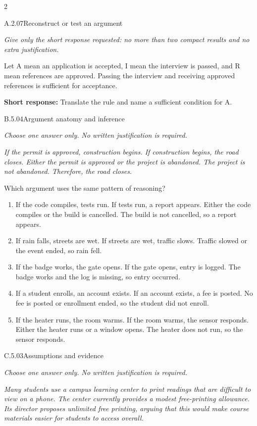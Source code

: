 \documentclass[9pt]{extarticle}
\newcommand{\choice}[1]{\item #1}
\begin{document}
\CoreWorkArea
\FormBreak
{}
\begin{multicols}{2}
\begin{DenseCoreProblem}{A.2.07}{Reconstruct or test an argument}
{\scriptsize\textit{Give only the short response requested: no more than two compact results and no extra justification.}\par}
Let A mean an application is accepted, I mean the interview is passed, and R mean references are approved. Passing the interview and receiving approved references is sufficient for acceptance.

\textbf{Short response:} Translate the rule and name a sufficient condition for A.
\end{DenseCoreProblem}
\begin{DenseCoreProblem}{B.5.04}{Argument anatomy and inference}
{\scriptsize\textit{Choose one answer only. No written justification is required.}\par}
\emph{If the permit is approved, construction begins. If construction begins, the road closes. Either the permit is approved or the project is abandoned. The project is not abandoned. Therefore, the road closes.}

Which argument uses the same pattern of reasoning?
\begin{enumerate}[label=(\alph*)]
  \choice{If the code compiles, tests run. If tests run, a report appears. Either the code compiles or the build is cancelled. The build is not cancelled, so a report appears.}
  \choice{If rain falls, streets are wet. If streets are wet, traffic slows. Traffic slowed or the event ended, so rain fell.}
  \choice{If the badge works, the gate opens. If the gate opens, entry is logged. The badge works and the log is missing, so entry occurred.}
  \choice{If a student enrolls, an account exists. If an account exists, a fee is posted. No fee is posted or enrollment ended, so the student did not enroll.}
  \choice{If the heater runs, the room warms. If the room warms, the sensor responds. Either the heater runs or a window opens. The heater does not run, so the sensor responds.}
\end{enumerate}
\end{DenseCoreProblem}
\columnbreak
\begin{DenseCoreProblem}{C.5.03}{Assumptions and evidence}
{\scriptsize\textit{Choose one answer only. No written justification is required.}\par}
\emph{Many students use a campus learning center to print readings that are difficult to view on a phone. The center currently provides a modest free-printing allowance. Its director proposes unlimited free printing, arguing that this would make course materials easier for students to access overall.}


\end{DenseCoreProblem}
\end{multicols}
\end{document}
